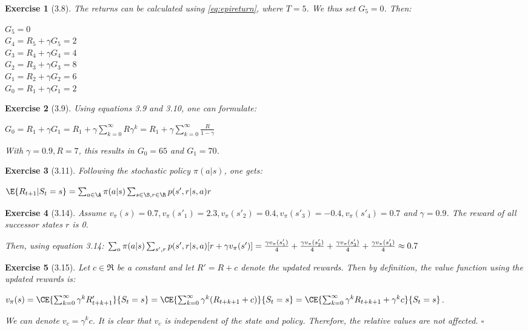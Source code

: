 \documentclass[a4paper]{scrartcl}
\theoremstyle{nonumberplain}
\newtheorem{ex}{Exercise}
\begin{document}
\begin{ex}[3.8]
The returns can be calculated using \autoref{eq:epireturn}, where $T=5$. We thus set $G_5=0$. Then:

$G_5=0$\\
$G_4=R_5+\gamma G_5=2$\\
$G_3=R_4+\gamma G_4=4$\\
$G_2=R_3+\gamma G_3=8$\\
$G_1=R_2+\gamma G_2=6$\\
$G_0=R_1+\gamma G_1=2$
\end{ex}

\begin{ex}[3.9]
Using equations 3.9 and 3.10, one can formulate:

$G_0=R_1+\gamma G_1= R_1 + \gamma \sum_{k=0}^{\infty}R\gamma^k=R_1 + \gamma \sum_{k=0}^{\infty}\frac{R}{1-\gamma}$

With $\gamma=0.9, R=7$, this results in $G_0=65$ and $G_1=70$.
\end{ex}

\begin{ex}[3.11]
Following the stochastic policy $\pi(a|s)$, one gets:

$\E{R_{t+1}|S_t=s}=\sum_{a \in \A} \pi(a|s) \sum_{s \in \S, r \in \R} p(s', r | s, a) r$
\end{ex}

\begin{ex}[3.14]
Assume $v_\pi(s)=0.7,v_\pi(s'_1)=2.3,v_\pi(s'_2)=0.4,v_\pi(s'_3)=-0.4,v_\pi(s'_4)=0.7$ and $\gamma=0.9$. The reward of all successor states $r$ is 0.

Then, using equation 3.14:
$\sum_a \pi(a|s) \sum_{s',r} p(s',r|s,a) [r+\gamma v_\pi(s')]=\\
\frac{\gamma v_\pi(s'_1)}{4} + \frac{\gamma v_\pi(s'_2)}{4} + \frac{\gamma v_\pi(s'_3)}{4} + \frac{\gamma v_\pi(s'_4)}{4}\approx0.7$
\end{ex}

\begin{ex}[3.15]
Let $c \in \Re$ be a constant and let $R'=R+c$ denote the updated rewards. Then by definition, the value function using the updated rewards is:

$v_\pi(s)=\CE{\sum_{k=0}^{\infty} \gamma^k R'_{t+k+1}}{S_t=s}=\\
\CE{\sum_{k=0}^{\infty} \gamma^k (R_{t+k+1} + c)}{S_t=s}=\\
\CE{\sum_{k=0}^{\infty} \gamma^k R_{t+k+1} + \gamma^k c}{S_t=s}$.

We can denote $v_c=\gamma^k c$. It is clear that $v_c$ is independent of the state and policy. Therefore, the relative values are not affected. $\square$
\end{ex}
\end{document}
